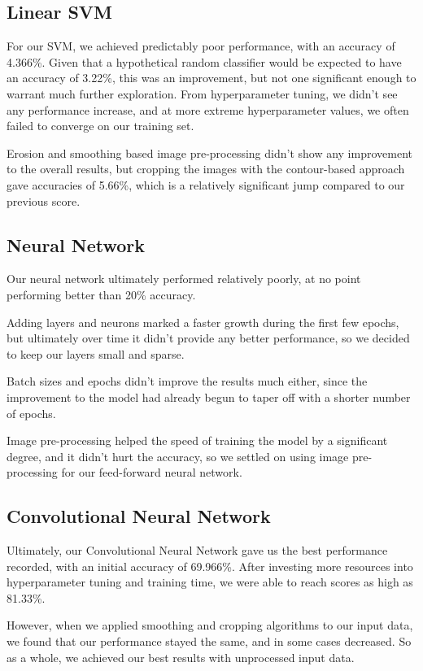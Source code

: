 \documentclass[conference]{IEEEtran}
\begin{document}
\subsection{Linear SVM}

For our SVM, we achieved predictably poor performance, with an accuracy of 4.366\%. Given that a hypothetical random classifier would be expected to have an accuracy of 3.22\%, this was an improvement, but not one significant enough to warrant much further exploration. From hyperparameter tuning, we didn't see any performance increase, and at more extreme hyperparameter values, we often failed to converge on our training set.

Erosion and smoothing based image pre-processing didn't show any improvement to the overall results, but cropping the images with the contour-based approach gave accuracies of 5.66\%, which is a relatively significant jump compared to our previous score.

\subsection{Neural Network}

Our neural network ultimately performed relatively poorly, at no point performing better than 20\% accuracy.

Adding layers and neurons marked a faster growth during the first few epochs, but ultimately over time it didn't provide any better performance, so we decided to keep our layers small and sparse.

Batch sizes and epochs didn't improve the results much either, since the improvement to the model had already begun to taper off with a shorter number of epochs.

Image pre-processing helped the speed of training the model by a significant degree, and it didn't hurt the accuracy, so we settled on using image pre-processing for our feed-forward neural network.

\subsection{Convolutional Neural Network}

Ultimately, our Convolutional Neural Network gave us the best performance recorded, with an initial accuracy of 69.966\%. After investing more resources into hyperparameter tuning and training time, we were able to reach scores as high as 81.33\%.

However, when we applied smoothing and cropping algorithms to our input data, we found that our performance stayed the same, and in some cases decreased. So as a whole, we achieved our best results with unprocessed input data.
\end{document}
